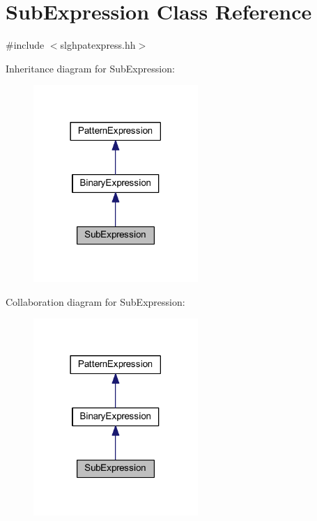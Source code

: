 \hypertarget{class_sub_expression}{}\section{Sub\+Expression Class Reference}
\label{class_sub_expression}


{\ttfamily \#include $<$slghpatexpress.\+hh$>$}



Inheritance diagram for Sub\+Expression\+:
\nopagebreak
\begin{figure}[H]
\begin{center}
\leavevmode
\includegraphics[width=177pt]{class_sub_expression__inherit__graph}
\end{center}
\end{figure}


Collaboration diagram for Sub\+Expression\+:
\nopagebreak
\begin{figure}[H]
\begin{center}
\leavevmode
\includegraphics[width=177pt]{class_sub_expression__coll__graph}
\end{center}
\end{figure}
